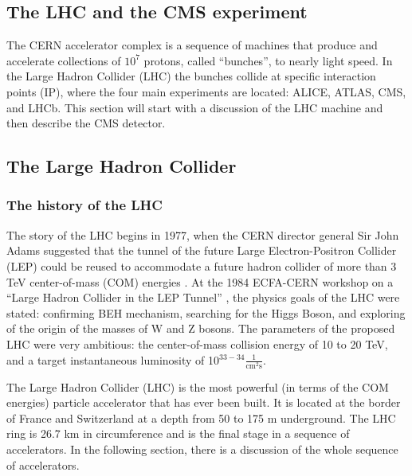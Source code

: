 
\begin{normalsize}



\chapter{The LHC and the CMS experiment}
\label{ch:cms}
The CERN accelerator complex is a sequence of machines that produce and accelerate collections of $10^{7}$ protons, called ``bunches'', to nearly light speed. In the Large Hadron Collider (LHC) the bunches collide at specific interaction points (IP), where the four main experiments are located: ALICE, ATLAS, CMS, and LHCb. This section will start with a discussion of the LHC machine and then describe the CMS detector. 

\section{The Large Hadron Collider}\label{sec:cms_intro}



\subsection{The history of the LHC}

The story of the LHC begins in 1977, when the CERN director general Sir John Adams suggested that the tunnel of the future Large Electron-Positron Collider (LEP) could be reused to accommodate a future hadron collider of more than 3 TeV center-of-mass (COM) energies \cite{Sadenius}. At the 1984 ECFA-CERN workshop on a ``Large Hadron Collider in the LEP Tunnel'' \cite{LHC1984}, the physics goals of the LHC were stated: confirming BEH mechanism, searching for the Higgs Boson, and exploring of the origin of the masses of W and Z bosons. The parameters of the proposed LHC were very ambitious: the center-of-mass collision energy of 10 to 20 TeV, and a target instantaneous luminosity of 10$^{33-34}\frac{1}{\textrm{cm}^{2}\textrm{s}}$. 

The Large Hadron Collider (LHC) is the most powerful (in terms of the COM energies) particle accelerator that has ever been built. It is located at the border of France and Switzerland at a depth from 50 to 175 m underground. The LHC ring is 26.7 km in circumference and is the final stage in a sequence of accelerators. In the following section, there is a discussion of the whole sequence of accelerators.



\end{normalsize}

